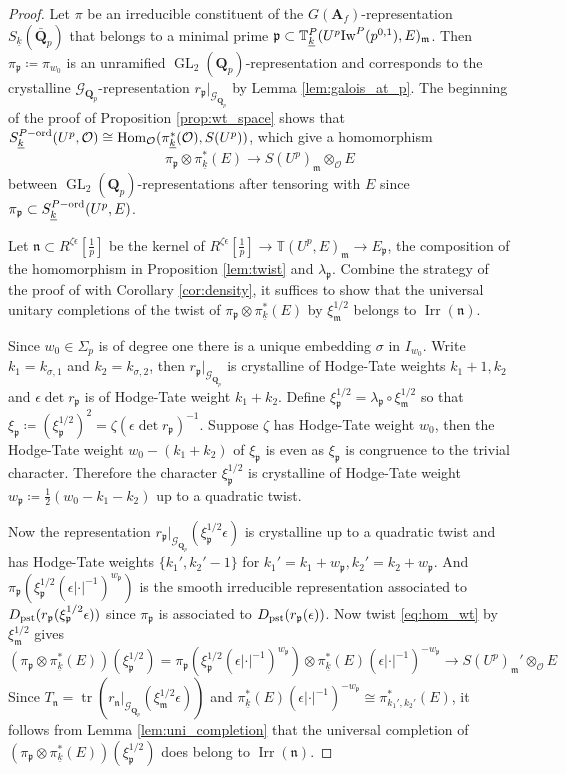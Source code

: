 \documentclass[leqno]{amsart}
\theoremstyle{definition}
\theoremstyle{remark}
\newcommand{\oo}{\mathcal{O}}
\newcommand{\Q}{{\mathbf{Q}}}
\newcommand{\Qp}{\mathbf{Q}_p}
\newcommand{\A}{\mathbf A}
\DeclareMathOperator{\Hom}{Hom}
\DeclareMathOperator{\GL}{GL}
\DeclareMathOperator{\mtr}{tr}
\newcommand{\pst}{\textnormal{pst}}
\newcommand{\fm}{\mathfrak{m}}
\newcommand{\fn}{\mathfrak{n}}
\newcommand{\fp}{\mathfrak{p}}
\DeclareMathOperator{\Irr}{Irr}
\newcommand{\Gp}{\mathcal{G}_{\Qp}} %
\newcommand{\wt}[1]{\underline{ #1 }}
\newcommand{\Iw}{\textnormal{Iw}} %
\newcommand{\TT}{\mathbb{T}} %
\newcommand{\ord}{\textnormal{ord}} %
\begin{document}
\begin{proof}

Let $\pi$ be an irreducible constituent of
the $G(\A_f)$-representation $S_{\wt{k}}(\bar{\Q}_p)$
that belongs to a minimal prime
$\fp\subset \TT_{\wt{k}}^P(U^p\Iw^P(p^{0,1}),E)_{\fm}$.
Then $\pi_{\fp}\coloneqq\pi_{w_0}$
is an unramified $\GL_2(\Qp)$-representation
and corresponds to the crystalline $\Gp$-representation
$r_\fp\vert_{\Gp}$ by Lemma \ref{lem:galois_at_p}.
The beginning of the proof of
Proposition \ref{prop:wt_space} shows that 
$S_{\wt{k}}^{P-\ord}(U^p,\oo)\cong
\Hom_{\oo}(\pi_{\wt{k}}^*(\oo), S(U^p))$,
which give a homomorphism
\begin{equation}\label{eq:hom_wt}
    \pi_\fp\otimes \pi_{\wt{k}}^*(E)\to S(U^p)_\fm\otimes_{\oo}E
\end{equation}
between $\GL_2(\Qp)$-representations
after tensoring with $E$ since
$\pi_\fp\subset S^{P-\ord}_{\wt{k}}(U^p,E)$.


Let $\fn\subset R^{\zeta\epsilon}[\frac{1}{p}]$ be the kernel of 
$R^{\zeta\epsilon}[\frac{1}{p}]\to \TT(U^p,E)_{\fm}\to E_\fp$,
the composition of the homomorphism in Proposition \ref{lem:twist}
and $\lambda_\fp$.
Combine the strategy of the proof of \cite[Thm 3.5.5]{pan}
with Corollary \ref{cor:density},
it suffices to show that
the universal unitary completions of
the twist of $\pi_{\fp}\otimes\pi_{\wt{k}}^*(E)$
by $\xi_\fm^{1/2}$ belongs to $\Irr(\fn)$.

Since $w_0\in \Sigma_p$ is of degree one
there is a unique embedding $\sigma$ in $I_{w_0}$.
Write $k_1=k_{\sigma,1}$ and $k_2=k_{\sigma,2}$,
then $r_\fp\vert_{\Gp}$ is crystalline
of Hodge-Tate weights  $k_1+1,k_2$
and $\epsilon\det r_{\fp}$
is of Hodge-Tate weight $k_1+k_2$.
Define $\xi_\fp^{1/2}=\lambda_\fp\circ \xi_\fm^{1/2}$
so that $\xi_\fp\coloneqq(\xi_\fp^{1/2})^2=
\zeta(\epsilon\det r_\fp)^{-1}$.
Suppose $\zeta$ has Hodge-Tate weight $w_0$,
then the Hodge-Tate weight $w_0-(k_1+k_2)$ of
$\xi_\fp$ is even as $\xi_\fp$
is congruence to the trivial character.
Therefore the character $\xi_{\fp}^{1/2}$
is crystalline of Hodge-Tate weight 
$w_{\fp}\coloneqq \frac{1}{2}(w_0-k_1-k_2)$ 
up to a quadratic twist.

Now the representation
$r_{\fp}\vert_{\Gp}(\xi_{\fp}^{1/2}\epsilon)$
is crystalline up to a quadratic twist
and has Hodge-Tate weights  $\{k_1',k_2'-1\}$ 
for $k_1'=k_1+w_\fp, k_2'=k_2+w_\fp$.
And $\pi_\fp(\xi_\fp^{1/2}(\epsilon|\cdot|^{-1})^{w_\fp})$
is the smooth irreducible
representation associated to 
$D_{\pst}(r_{\fp}(\xi_\fp^{1/2}\epsilon))$
since $\pi_\fp$ is associated to 
$D_{\pst}(r_{\fp}(\epsilon))$.
Now twist \eqref{eq:hom_wt} by $\xi_\fm^{1/2}$ gives
\[
    (\pi_{\fp}\otimes \pi_{\wt{k}}^*(E))(\xi_\fp^{1/2})=
    \pi_\fp(\xi_\fp^{1/2}(\epsilon|\cdot|^{-1})^{w_\fp})
    \otimes \pi_{\wt{k}}^*(E)(\epsilon|\cdot|^{-1})^{-w_{\fp}} \to 
    S(U^p)_\fm'\otimes_{\oo}E
\]
Since  $T_\fn=\mtr(r_{\fn}\vert_{\Gp}(\xi_\fm^{1/2}\epsilon))$
and $\pi_{\wt{k}}^*(E)(\epsilon|\cdot|^{-1})^{-w_{\fp}}\cong 
\pi_{k_1',k_2'}^*(E)$,
it follows from Lemma \ref{lem:uni_completion}
that the universal completion of 
$(\pi_{\fp}\otimes \pi_{\wt{k}}^*(E))(\xi_\fp^{1/2})$
does belong to $\Irr(\fn)$.
\end{proof}
\end{document}
